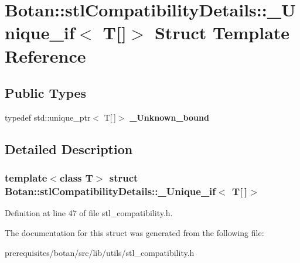 \hypertarget{struct_botan_1_1stl_compatibility_details_1_1___unique__if_3_01_t[]_4}{}\section{Botan\+:\+:stl\+Compatibility\+Details\+:\+:\+\_\+\+Unique\+\_\+if$<$ T\mbox{[}\mbox{]}$>$ Struct Template Reference}
\label{struct_botan_1_1stl_compatibility_details_1_1___unique__if_3_01_t[]_4}
\subsection*{Public Types}
\begin{DoxyCompactItemize}
\item 
\mbox{\label{struct_botan_1_1stl_compatibility_details_1_1___unique__if_3_01_t[]_4_a9beb941851e81132a571db19c7d79266}} 
typedef std\+::unique\+\_\+ptr$<$ T\mbox{[}$\,$\mbox{]}$>$ {\bfseries \+\_\+\+Unknown\+\_\+bound}
\end{DoxyCompactItemize}


\subsection{Detailed Description}
\subsubsection*{template$<$class T$>$\newline
struct Botan\+::stl\+Compatibility\+Details\+::\+\_\+\+Unique\+\_\+if$<$ T\mbox{[}$\,$\mbox{]}$>$}



Definition at line 47 of file stl\+\_\+compatibility.\+h.



The documentation for this struct was generated from the following file\+:\begin{DoxyCompactItemize}
\item 
prerequisites/botan/src/lib/utils/stl\+\_\+compatibility.\+h\end{DoxyCompactItemize}

